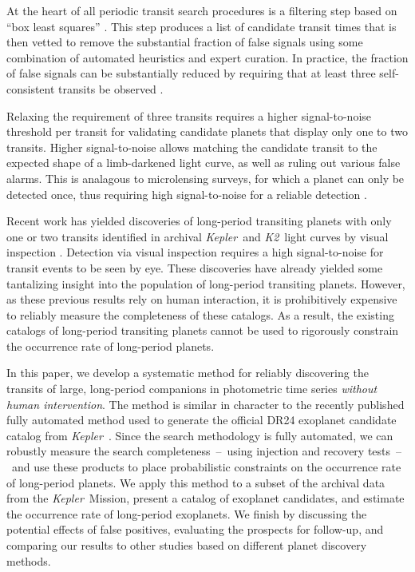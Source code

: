 \documentclass[manuscript, letterpaper]{aastex6}
\newcommand{\project}[1]{\textsl{#1}}
\newcommand{\kepler}{\project{Kepler}}
\newcommand{\KT}{\project{K2}}
\newcommand{\bls}{\project{BLS}}
\newcommand{\paper}{paper}
\begin{document}
At the heart of all periodic transit search procedures is a filtering step
based on ``box least squares'' \citep[\bls;][]{Kovacs:2002}.
This step produces a list of candidate transit times that is then vetted to
remove the substantial fraction of false signals using some combination of
automated heuristics and expert curation.
In practice, the fraction of false signals can be substantially reduced by
requiring that at least three self-consistent transits be observed
\citep{Petigura:2013, Burke:2014, Rowe:2015, Coughlin:2016}.

Relaxing the requirement of three transits requires a higher signal-to-noise
threshold per transit for validating candidate planets that display only one
to two transits.
Higher signal-to-noise allows matching the candidate transit to the expected
shape of a limb-darkened light curve, as well as ruling out various false
alarms.  This is analagous to microlensing surveys, for which a planet can only be
detected once, thus requiring high signal-to-noise for a reliable detection
\citep{Gould:2004}.

Recent work has yielded discoveries of long-period transiting planets with
only one or two transits identified in archival \kepler\ and \KT\ light curves
by visual inspection \citep{Wang:2013, Kipping:2014a, Osborn:2016,
Kipping:2016, Uehara:2016, Wang:2015}.  Detection via visual inspection requires
a high signal-to-noise for transit events to be seen by eye.
These discoveries have already yielded some tantalizing insight into the
population of long-period transiting planets.  However, as these previous results
rely on human interaction, it is prohibitively expensive to reliably measure
the completeness of these catalogs.
As a result, the existing catalogs of long-period transiting planets cannot be
used to rigorously constrain the occurrence rate of long-period planets.

In this \paper, we develop a systematic method for reliably discovering the
transits of large, long-period companions in photometric time series
\emph{without human intervention}.
The method is similar in character to the recently published fully automated
method used to generate the official DR24 exoplanet candidate catalog from
\kepler\ \citep{Mullally:2016, Coughlin:2016}.
Since the search methodology is fully automated, we can robustly measure the
search completeness~--~using injection and recovery tests~--~and use these
products to place probabilistic constraints on the occurrence rate of
long-period planets.
We apply this method to a subset of the archival data from the \kepler\
Mission, present a catalog of exoplanet candidates, and estimate the
occurrence rate of long-period exoplanets.
We finish by discussing the potential effects of false positives, evaluating the
prospects for follow-up, and comparing our results to other studies
based on different planet discovery methods.
\end{document}
